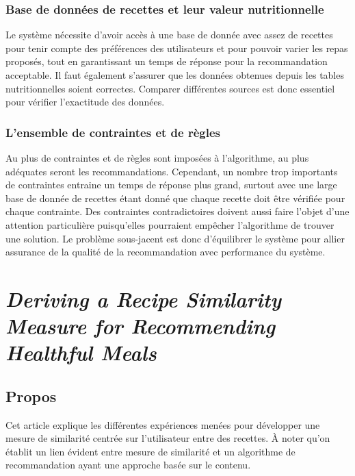 \documentclass[a4paper, 11pt]{article}
\begin{document}
\subsubsection{Base de données de recettes et leur valeur nutritionnelle}
Le système nécessite d'avoir accès à une base de donnée avec assez de recettes pour tenir compte des préférences des utilisateurs et pour pouvoir varier les repas proposés, tout en garantissant un temps de réponse pour la recommandation acceptable. Il faut également s'assurer que les données obtenues depuis les tables nutritionnelles soient correctes. Comparer différentes sources est donc essentiel pour vérifier l'exactitude des données.

\subsubsection{L'ensemble de contraintes et de règles}
Au plus de contraintes et de règles sont imposées à l'algorithme, au plus adéquates seront les recommandations. Cependant, un nombre trop importants de contraintes entraine un temps de réponse plus grand, surtout avec une large base de donnée de recettes étant donné que chaque recette doit être vérifiée pour chaque contrainte. Des contraintes contradictoires doivent aussi faire l'objet d'une attention particulière puisqu'elles pourraient empêcher l'algorithme de trouver une solution. 
Le problème sous-jacent est donc d'équilibrer le système pour allier assurance de la qualité de la recommandation avec performance du système.

\section{\textit{Deriving a Recipe Similarity Measure for Recommending Healthful Meals}}
\subsection{Propos}
Cet article explique les différentes expériences menées pour développer une mesure de similarité centrée sur l'utilisateur entre des recettes. À noter qu'on établit un lien évident entre mesure de similarité et un algorithme de recommandation ayant une approche basée sur le contenu. 
\end{document}
